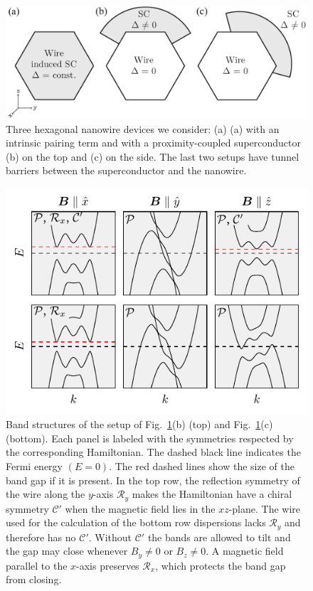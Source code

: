 \begin{figure}
\begin{center}
\includegraphics[width=0.7\columnwidth]{chapter_orbitalfield/figures/geometry}
\caption{Three hexagonal nanowire devices we consider: (a) (a) with an intrinsic pairing term and with a proximity-coupled superconductor (b) on the top and (c) on the side.
The last two setups have tunnel barriers between the superconductor and the nanowire.
\label{fig:geometry}}
\end{center}
\end{figure}

\begin{figure}
\begin{center}
\includegraphics[width=0.7\columnwidth]{chapter_orbitalfield/figures/bandstructure_annotated}
\caption{Band structures of the setup of Fig.~\ref{fig:geometry}(b) (top) and Fig.~\ref{fig:geometry}(c) (bottom).
Each panel is labeled with the symmetries respected by the corresponding Hamiltonian.
The dashed black line indicates the Fermi energy $(E=0)$.
The red dashed lines show the size of the band gap if it is present.
In the top row, the reflection symmetry of the wire along the $y$-axis $\mathcal{R}_y$ makes the Hamiltonian have a chiral symmetry $\mathcal{C}'$ when the magnetic field lies in the $xz$-plane.
The wire used for the calculation of the bottom row dispersions lacks $\mathcal{R}_y$ and therefore has no $\mathcal{C}'$.
Without $\mathcal{C}'$ the bands are allowed to tilt and the gap may close whenever $B_y \neq 0$ or $B_z \neq 0$.
A magnetic field parallel to the $x$-axis preserves $\mathcal{R}_x$, which protects the band gap from closing.\label{fig:bandstructure}}
\end{center}
\end{figure}

